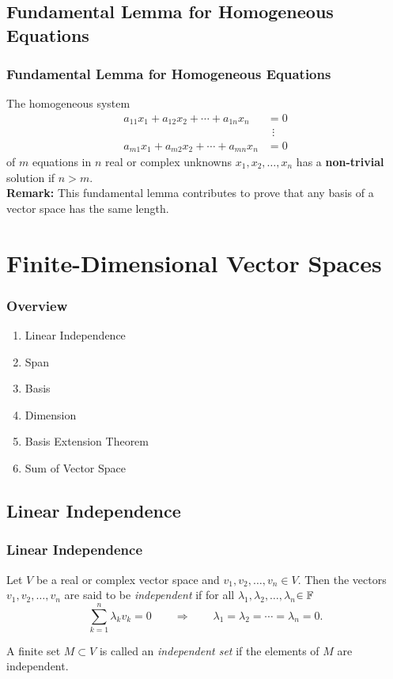 \documentclass{beamer}
\renewcommand{\emph}[1]{{\color{Turquoise3}\textsl{#1}}}
\newcommand{\myseries}[2]{$#1_1,#1_2,\dots,#1_#2$}
\begin{document}
\subsection{Fundamental Lemma for Homogeneous Equations}
\begin{frame}
    \frametitle{Fundamental Lemma for Homogeneous Equations}
    The homogeneous system
    \begin{align*}
        a_{11}x_1+a_{12}x_2+\cdots+a_{1n}x_n & =0       \\
                                             & ~~\vdots \\
        a_{m1}x_1+a_{m2}x_2+\cdots+a_{mn}x_n & =0
    \end{align*}
    of $m$ equations in $n$ real or complex unknowns \myseries{x}{n} has a \textbf{non-trivial} solution if $n>m$.\\[15pt]

    \textbf{Remark:} This fundamental lemma contributes to prove that any basis of a vector space has the same length.

\end{frame}

\section{Finite-Dimensional Vector Spaces}

\begin{frame}
    \frametitle{Overview}
    \begin{enumerate}
        \item Linear Independence
        \item Span
        \item Basis
        \item Dimension
        \item Basis Extension Theorem
        \item Sum of Vector Space
    \end{enumerate}
\end{frame}

\subsection{Linear Independence}
\begin{frame}
    \frametitle{Linear Independence}
    Let $V$ be a real or complex vector space and \myseries{v}{n}$\in V$. Then the vectors \myseries{v}{n} are said to be \emph{independent} if for all \myseries{\lambda}{n}$\in\mathbb{F}$ \vspace*{-4mm}
    \[\sum_{k=1}^{n}\lambda_kv_k=0\qquad\Rightarrow\qquad\lambda_1=\lambda_2=\cdots=\lambda_n=0.\]

    A finite set $M\subset V$ is called an \emph{independent set} if the elements of $M$ are independent.
\end{frame}
\end{document}
